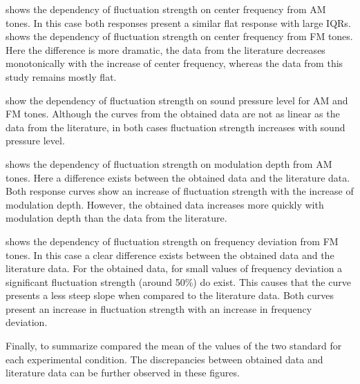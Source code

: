 \documentclass[../main.tex]{subfiles}
\begin{document}
 shows the dependency of fluctuation strength
on center frequency from \gls{AM} tones. In this case both responses present a
similar flat response with large \gls{IQR}s. 
shows the dependency of fluctuation strength on center frequency from \gls{FM}
tones. Here the difference is more dramatic, the data from the literature
decreases monotonically with the increase of center frequency, whereas the data
from this study remains mostly flat.

 show the
dependency of fluctuation strength on sound pressure level for \gls{AM} and
\gls{FM} tones. Although the curves from the obtained data are not as linear as
the data from the literature, in both cases fluctuation strength increases with
sound pressure level.

 shows the dependency of fluctuation strength
on modulation depth from \gls{AM} tones. Here a difference exists between the
obtained data and the literature data. Both response curves show an increase
of fluctuation strength with the increase of modulation depth. However, the
obtained data increases more quickly with modulation depth than the data from
the literature.

 shows the dependency of fluctuation strength
on frequency deviation from \gls{FM} tones. In this case a clear difference
exists between the obtained data and the literature data. For the obtained data,
for small values of frequency deviation a significant fluctuation strength
(around 50\%) do exist. This causes that the curve presents a less steep slope
when compared to the literature data. Both curves present an increase in
fluctuation strength with an increase in frequency deviation.

Finally, to summarize  compared the
mean of the values of the two standard for each experimental condition. The
discrepancies between obtained data and literature data can be further observed
in these figures.
\end{document}
